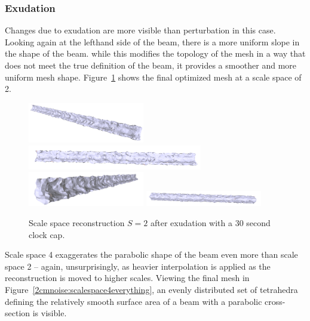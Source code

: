 \documentclass[12pt]{drexelthesis}
\let\Oldsubsubsection\subsubsection
\renewcommand{\subsubsection}{\FloatBarrier\Oldsubsubsection}
\begin{document}
\subsubsection{Exudation}

Changes due to exudation are more visible than perturbation in this case. Looking again at the lefthand side of the beam, there is a more uniform slope in the shape of the beam. while this modifies the topology of the mesh in a way that does not meet the true definition of the beam, it provides a smoother and more uniform mesh shape. Figure~\ref{2cmnoise:scalespace2everything} shows the final optimized mesh at a scale space of 2.

\begin{figure}[!ht]
	\centering
		\includegraphics[width=2in]{simulated-lab-scan/2cmnoise/optimized/scalespace2everything00.png}
		\includegraphics[width=3in]{simulated-lab-scan/2cmnoise/optimized/scalespace2everything01.png}
		\includegraphics[width=2in]{simulated-lab-scan/2cmnoise/optimized/scalespace2everything02.png}
		\includegraphics[width=2in]{simulated-lab-scan/2cmnoise/optimized/scalespace2everything03.png}
		\caption[Scale space reconstruction $S = 2$ after after exudation with a 30 second clock cap]{\centering Scale space reconstruction $S = 2$ after exudation with a 30 second clock cap.}
	\label{2cmnoise:scalespace2everything}
\end{figure}

Scale space 4 exaggerates the parabolic shape of the beam even more than scale space 2 -- again, unsurprisingly, as heavier interpolation is applied as the reconstruction is moved to higher scales. Viewing the final mesh in Figure~\ref{2cmnoise:scalespace4everything}, an evenly distributed set of tetrahedra defining the relatively smooth surface area of a beam with a parabolic cross-section is visible.
\end{document}
